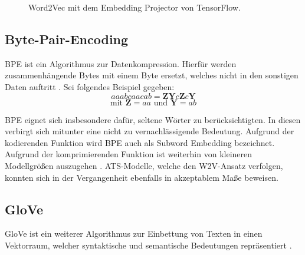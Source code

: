 \begin{figure}[h!]
  \centering
  \caption{Word2Vec mit dem Embedding Projector von TensorFlow.}
  \label{pic:OnlineSphere}
\end{figure}


\subsection{Byte-Pair-Encoding}
\noindent
\ac{BPE} ist ein Algorithmus zur Datenkompression. Hierfür werden zusammenhängende Bytes mit einem Byte ersetzt, welches nicht in den sonstigen Daten auftritt \cite[S.~24]{NIT19}. Sei folgendes Beispiel gegeben: $$aaabcaacab = \boldsymbol{Z}\boldsymbol{Y}c\boldsymbol{Z}c\boldsymbol{Y}$$ $$\text{mit } \boldsymbol{Z} = aa \text{ und } \boldsymbol{Y} = ab$$

\noindent
\ac{BPE} eignet sich insbesondere dafür, seltene Wörter zu berücksichtigten. In diesen verbirgt sich mitunter eine nicht zu vernachlässigende Bedeutung. Aufgrund der kodierenden Funktion wird \ac{BPE} auch als Subword Embedding bezeichnet. Aufgrund der komprimierenden Funktion ist weiterhin von kleineren Modellgrößen auszugehen \cite[S.~24]{NIT19}. \ac{ATS}-Modelle, welche den \ac{W2V}-Ansatz verfolgen, konnten sich in der Vergangenheit ebenfalls in akzeptablem Maße beweisen.


\subsection{GloVe}
\noindent
\ac{GloVe} ist ein weiterer Algorithmus zur Einbettung von Texten in einen Vektorraum, welcher syntaktische und semantische Bedeutungen repräsentiert \cite[S.~1]{PEN14}.\\

